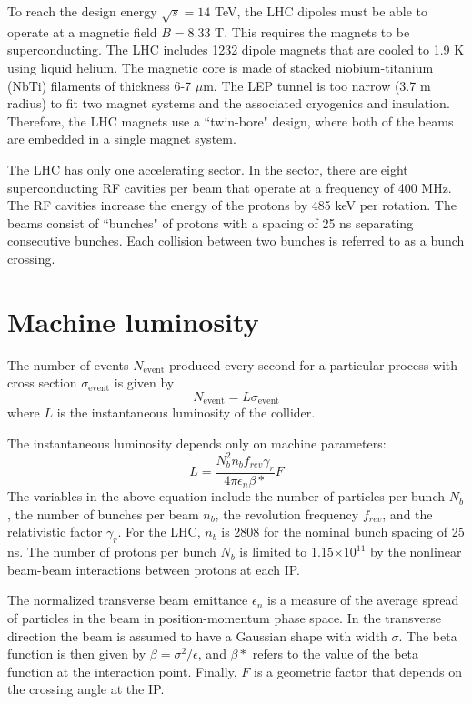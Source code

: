To reach the design energy $\sqrt{s} = 14$ TeV, the LHC dipoles must be able to operate at a magnetic field $B = 8.33$ T. This requires the magnets to be superconducting. The LHC includes 1232 dipole magnets that are cooled to 1.9 K using liquid helium. The magnetic core is made of stacked niobium-titanium (NbTi) filaments of thickness 6-7 $\mu$m. The LEP tunnel is too narrow (3.7 m radius) to fit two magnet systems and the associated cryogenics and insulation. Therefore, the LHC magnets use a ``twin-bore" design, where both of the beams are embedded in a single magnet system.

The LHC has only one accelerating sector. In the sector, there are eight superconducting RF cavities per beam that operate at a frequency of 400 MHz. The RF cavities increase the energy of the protons by 485 keV per rotation. The beams consist of ``bunches" of protons with a spacing of 25 ns separating consecutive bunches. Each collision between two bunches is referred to as a bunch crossing. 

\section{Machine luminosity}
\label{sec:tunnel}

The number of events $N_{\mathrm{event}}$ produced every second for a particular process with cross section $\sigma_{\mathrm{event}}$ is given by
\begin{equation}
N_{\mathrm{event}} = L\sigma_{\mathrm{event}}
\end{equation}
where $L$ is the instantaneous luminosity of the collider. 

The instantaneous luminosity depends only on machine parameters: 
\begin{equation}
L = \frac{N_b^2 n_b f_{rev} \gamma_r}{4\pi\epsilon_n\beta\ast}F
\end{equation}
The variables in the above equation include the number of particles per bunch $N_b$, the number of bunches per beam $n_b$, the revolution frequency $f_{rev}$, and the relativistic factor $\gamma_r$. For the LHC, $n_b$ is 2808 for the nominal bunch spacing of 25 ns. The number of protons per bunch $N_b$ is limited to 1.15$\times 10^{11}$ by the nonlinear beam-beam interactions between protons at each IP. 

The normalized transverse beam emittance $\epsilon_n$ is a measure of the average spread of particles in the beam in position-momentum phase space. In the transverse direction the beam is assumed to have a Gaussian shape with width $\sigma$. The beta function is then given by $\beta = \sigma^2 /\epsilon$, and $\beta\ast$ refers to the value of the beta function at the interaction point. Finally, $F$ is a geometric factor that depends on the crossing angle at the IP. 

